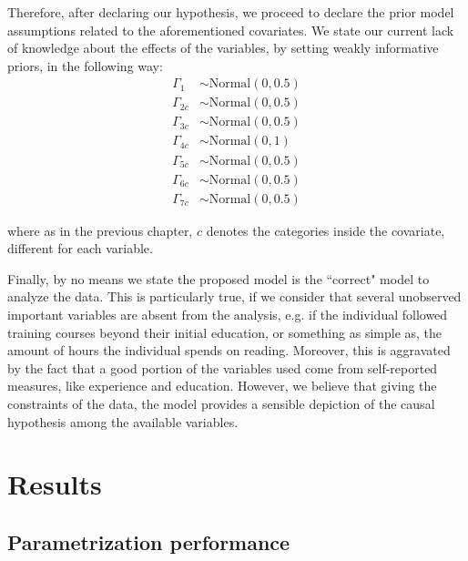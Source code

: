 Therefore, after declaring our hypothesis, we proceed to declare the prior model assumptions related to the aforementioned covariates. We state our current lack of knowledge about the effects of the variables, by setting weakly informative priors, in the following way: 
%
\begin{align}
	\Gamma_{1} &\sim \text{Normal}( 0, 0.5 ) \\
	\Gamma_{2c} &\sim \text{Normal}( 0, 0.5 ) \\
	\Gamma_{3c} &\sim \text{Normal}( 0, 0.5 ) \\
	\Gamma_{4c} &\sim \text{Normal}( 0, 1 ) \\
	\Gamma_{5c} &\sim \text{Normal}( 0, 0.5 ) \\
	\Gamma_{6c} &\sim \text{Normal}( 0, 0.5 )  \\
	\Gamma_{7c} &\sim \text{Normal}( 0, 0.5 ) 
\end{align} 

\noindent where as in the previous chapter, $c$ denotes the categories inside the covariate, different for each variable. 

Finally, by no means we state the proposed model is the ``correct" model to analyze the data. This is particularly true, if we consider that several unobserved important variables are absent from the analysis, e.g. if the individual followed training courses beyond their initial education, or something as simple as, the amount of hours the individual spends on reading. Moreover, this is aggravated by the fact that a good portion of the variables used come from self-reported measures, like experience and education. However, we believe that giving the constraints of the data, the model provides a sensible depiction of the causal hypothesis among the available variables.


\section{Results}


\subsection{Parametrization performance}


